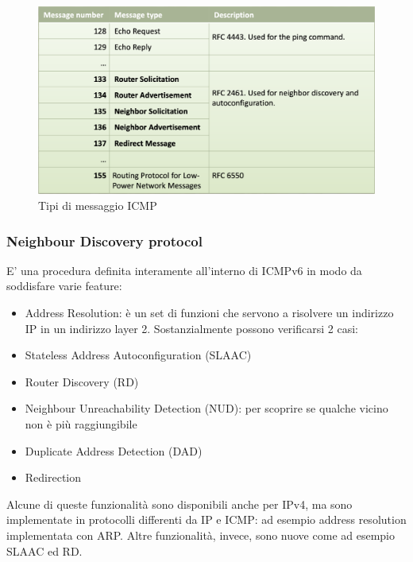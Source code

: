 \documentclass{article}
\begin{document}
\begin{figure}[H]
\centering
\includegraphics[scale=0.3]{figures/tipi ICMP.png}
\caption{Tipi di messaggio ICMP}
\end{figure}

\subsubsection{Neighbour Discovery protocol}
E' una procedura definita interamente all'interno di ICMPv6 in modo da soddisfare varie feature:
\begin{itemize}
    \item Address Resolution: è un set di funzioni che servono a risolvere un indirizzo IP in un indirizzo layer 2. Sostanzialmente possono verificarsi 2 casi:
    \item Stateless Address Autoconfiguration (SLAAC)
    \item Router Discovery (RD)
    \item Neighbour Unreachability Detection (NUD): per scoprire se qualche vicino non è più raggiungibile
    \item Duplicate Address Detection (DAD)
    \item Redirection
\end{itemize}
Alcune di queste funzionalità sono disponibili anche per IPv4, ma sono implementate in protocolli differenti da IP e ICMP: ad esempio address resolution implementata con ARP. Altre funzionalità, invece, sono nuove come ad esempio SLAAC ed RD.
\end{document}
